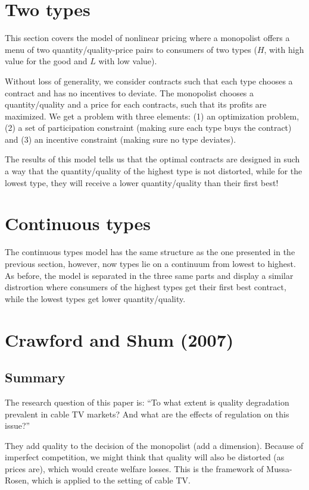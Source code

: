 \section{Two types}

This section covers the model of nonlinear pricing where a monopolist offers a menu of two quantity/quality-price pairs to consumers of two types ($H$, with high value for the good and $L$ with low value).

Without loss of generality, we consider contracts such that each type chooses a contract and has no incentives to deviate. The monopolist chooses a quantity/quality and a price for each contracts, such that its profits are maximized. We get a problem with three elements: (1) an optimization problem, (2) a set of participation constraint (making sure each type buys the contract) and (3) an incentive constraint (making sure no type deviates).

The results of this model tells us that the optimal contracts are designed in such a way that the quantity/quality of the highest type is not distorted, while for the lowest type, they will receive a lower quantity/quality than their first best!

\section{Continuous types}

The continuous types model has the same structure as the one presented in the previous section, however, now types lie on a continuum from lowest to highest. As before, the model is separated in the three same parts and display a similar distrortion where consumers of the highest types get their first best contract, while the lowest types get lower quantity/quality.

\section{Crawford and Shum (2007)}

\subsection{Summary}

The research question of this paper is: ``To what extent is quality degradation prevalent in cable TV markets? And what are the effects of regulation on this issue?''

They add quality to the decision of the monopolist (add a dimension). Because of imperfect competition, we might think that quality will also be distorted (as prices are), which would create welfare losses. This is the framework of Mussa-Rosen, which is applied to the setting of cable TV.

